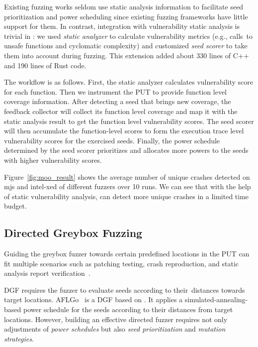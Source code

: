 Existing fuzzing works seldom use static analysis information to facilitate seed prioritization and power scheduling since existing fuzzing frameworks have little support for them.
In contrast, integration with vulnerability static analysis is trivial in \FOT: we used \emph{static analyzer} to calculate vulnerability metrics (e.g., calls~to unsafe functions and cyclomatic complexity) and customized \emph{seed scorer} to take them into account during fuzzing. This extension added about 330 lines of C++ and 190 lines of Rust code.

The workflow is as follows.
First, the static analyzer calculates vulnerability score for each function. Then we instrument the PUT to provide function level coverage information.
After detecting a seed that brings new coverage, the feedback collector will collect its function level coverage and map it with the static analysis result to get the function level vulnerability scores.
The seed scorer will then accumulate the function-level scores to form the execution trace level vulnerability scores for the exercised seeds.
Finally, the power schedule determined by the seed scorer prioritizes and allocates more powers to the seeds with higher vulnerability scores.



Figure~\ref{fig:moo_result} shows the average number of unique crashes detected on mjs and intel-xed of different fuzzers over 10 runs.
We can see that with the help of static vulnerability analysis, {\FOT} can detect more unique crashes in a limited time budget.
 

\subsection{Directed Greybox Fuzzing}\label{subsec:dgf}

Guiding the greybox fuzzer towards certain predefined locations in the PUT can fit multiple scenarios such as patching testing, crash reproduction, and static analysis report verification~\cite{Bohme:2017:DGF}.






DGF requires the fuzzer to evaluate seeds according to their~distances towards target locations.
AFLGo~\cite{Bohme:2017:DGF} is a DGF based on {\AFL}. It applies a simulated-annealing-based power schedule for the seeds according to their distances from target locations.
However, building an effective directed fuzzer requires not only adjustments of \emph{power schedules} but also \emph{seed prioritization} and \emph{mutation strategies}.



